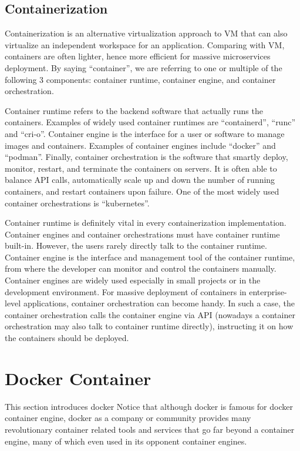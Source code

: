 \subsection{Containerization}

Containerization is an alternative virtualization approach to VM that can also virtualize an independent workspace for an application. Comparing with VM, containers are often lighter, hence more efficient for massive microservices deployment. By saying ``container'', we are referring to one or multiple of the following 3 components: container runtime, container engine, and container orchestration.

Container runtime refers to the backend software that actually runs the containers. Examples of widely used container runtimes are ``containerd'', ``runc'' and ``cri-o''. Container engine is the interface for a user or software to manage images and containers. Examples of container engines include ``docker'' and ``podman''. Finally, container orchestration is the software that smartly deploy, monitor, restart, and terminate the containers on servers. It is often able to balance API calls, automatically scale up and down the number of running containers, and restart containers upon failure. One of the most widely used container orchestrations is ``kubernetes''.

Container runtime is definitely vital in every containerization implementation. Container engines and container orchestrations must have container runtime built-in. However, the users rarely directly talk to the container runtime. Container engine is the interface and management tool of the container runtime, from where the developer can monitor and control the containers manually. Container engines are widely used especially in small projects or in the development environment. For massive deployment of containers in enterprise-level applications, container orchestration can become handy. In such a case, the container orchestration calls the container engine via API (nowadays a container orchestration may also talk to container runtime directly), instructing it on how the containers should be deployed.

\section{Docker Container} \label{ch:vac:sec:dc}

This section introduces docker Notice that although docker is famous for docker container engine, docker as a company or community provides many revolutionary container related tools and services that go far beyond a container engine, many of which even used in its opponent container engines.

